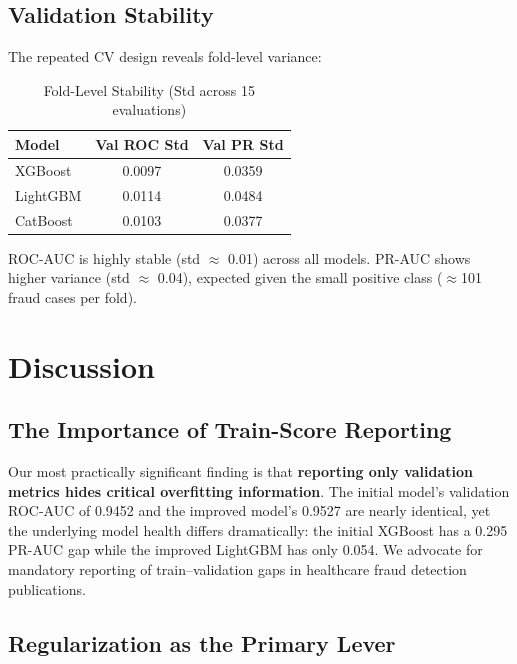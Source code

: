 \documentclass[conference]{IEEEtran}
\begin{document}
\subsection{Validation Stability}

The repeated CV design reveals fold-level variance:

\begin{table}[h]
\caption{Fold-Level Stability (Std across 15 evaluations)}
\label{tab:stability}
\centering
\small
\begin{tabular}{@{}lcc@{}}
\toprule
\textbf{Model} & \textbf{Val ROC Std} & \textbf{Val PR Std} \\
\midrule
XGBoost & 0.0097 & 0.0359 \\
LightGBM & 0.0114 & 0.0484 \\
CatBoost & 0.0103 & 0.0377 \\
\bottomrule
\end{tabular}
\vspace{-1mm}
\end{table}

ROC-AUC is highly stable (std $\approx$ 0.01) across all models. PR-AUC shows higher variance (std $\approx$ 0.04), expected given the small positive class ($\approx$101 fraud cases per fold).

\section{Discussion}
\label{sec:discussion}

\subsection{The Importance of Train-Score Reporting}

Our most practically significant finding is that \textbf{reporting only validation metrics hides critical overfitting information}. The initial model's validation ROC-AUC of 0.9452 and the improved model's 0.9527 are nearly identical, yet the underlying model health differs dramatically: the initial XGBoost has a 0.295 PR-AUC gap while the improved LightGBM has only 0.054. We advocate for mandatory reporting of train--validation gaps in healthcare fraud detection publications.

\subsection{Regularization as the Primary Lever}
\end{document}
